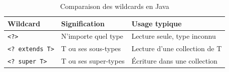 \begin{table}[H]
\centering
\begin{tabularx}{0.95\textwidth}{C{3.5cm} X X}
\toprule
\textbf{\color{primarycolor}Wildcard} &
\textbf{\color{primarycolor}Signification} &
\textbf{\color{primarycolor}Usage typique} \\
\midrule
\texttt{<?>} & N'importe quel type & Lecture seule, type inconnu \\
\addlinespace[0.15cm]
\texttt{<? extends T>} & T ou ses sous-types & Lecture d'une collection de T \\
\addlinespace[0.15cm]
\texttt{<? super T>} & T ou ses super-types & Écriture dans une collection \\
\bottomrule
\end{tabularx}
\caption{Comparaison des wildcards en Java}
\end{table}
